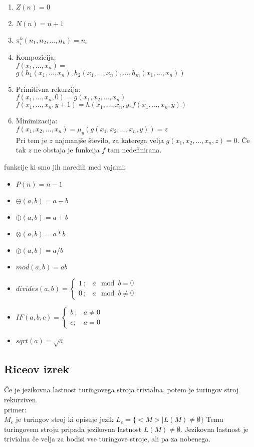 \documentclass[a4paper]{article}
\begin{document}
\begin{multicols}{2}
\begin{enumerate}
\item $Z(n)=0$
\item $N(n)=n+1$
\item $\pi^k_i (n_1, n_2, \dots, n_k)=n_i$
\item Kompozicija: \\
	$ f(x_1, \dots, x_n) = $ \\ $ g(h_1(x_1, \dots, x_n), h_2(x_1,\dots, x_n), \dots, h_m(x_1, \dots, x_n)) $ 
\item Primitivna rekurzija: \\
	$ f(x_1, \dots, x_n, 0) = g(x_1, x_2, \dots, x_n) $ \\
	$ f(x_1, \dots, x_n, y+1) = h(x_1, \dots, x_n, y, f(x_1, \dots, x_n, y)) $
\item Minimizacija: \\
	$ f(x_1, x_2, \dots, x_n) = \mu_y (g(x_1, x_2, \dots, x_n, y)) = z $ \\
	Pri tem je $z$ najmanjše število, za katerega velja $g(x_1, x_2, \dots, x_n, z) = 0$. Če tak $z$ ne obstaja je funkcija $f$ tam nedefinirana.
\end{enumerate}
funkcije ki smo jih naredili med vajami:
\begin{itemize}
\item $P(n) = n-1$
\item $\ominus(a,b) = a-b$
\item $\oplus(a,b) = a+b$
\item $\otimes(a,b) = a*b$
\item $\oslash(a,b) = a/b$
\item $mod(a,b) = ab$
\item $divides(a,b) = \begin{cases} 1 \ ; & a \mod b = 0 \\ 0 \ ; & a \mod b \neq 0 \end{cases}$
\item $IF(a,b,c) = \begin{cases} b \ ; & a \neq 0 \\ c ; & a = 0 \end{cases}$
\item $sqrt(a) = \sqrt{a} $

\end{itemize}

\subsection*{Riceov izrek}

Če je jezikovna lastnost turingovega stroja trivialna, potem je turingov stroj rekurziven.\\
primer:\\
$M_e$ je turingov stroj ki opisuje jezik $L_e = \lbrace <M> | L(M) \neq \emptyset \rbrace $
Temu turingovem stroju pripada jezikovna lastnost $ L(M) \neq \emptyset $. 
Jezikovna lastnost je trivialna če velja za bodisi vse turingove stroje, ali pa za nobenega.\\


\end{multicols}
\end{document}
